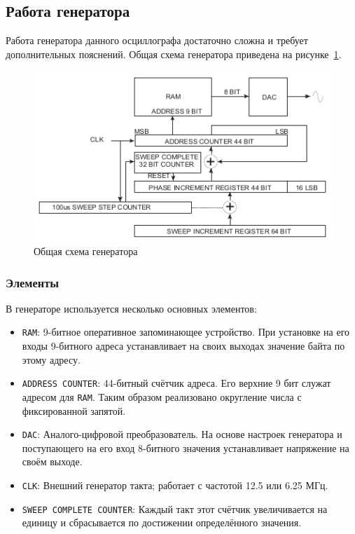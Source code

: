 \documentclass[a4paper,12pt]{report}
\numberwithin{equation}{section}
\begin{document}
\subsection{Работа генератора}
Работа генератора данного осциллографа достаточно сложна и требует
дополнительных пояснений. Общая схема генератора приведена на
рисунке~\ref{gen:plot}.

\begin{figure}[h!]
\centering
\includegraphics{sweep}
\caption{Общая схема генератора}
\label{gen:plot}
\end{figure}

\subsubsection{Элементы}
В генераторе используется несколько основных элементов:
\begin{itemize}
\item \texttt{RAM}: 9-битное оперативное запоминающее устройство. При установке на его
  входы 9-битного адреса устанавливает на своих выходах значение байта по этому
  адресу.
\item \texttt{ADDRESS COUNTER}: 44-битный счётчик адреса. Его верхние 9 бит
  служат адресом для \texttt{RAM}. Таким образом реализовано округление числа с
  фиксированной запятой.
\item \texttt{DAC}: Аналого-цифровой преобразователь. На основе настроек
  генератора и поступающего на его вход 8-битного значения устанавливает
  напряжение на своём выходе.
\item \texttt{CLK}: Внешний генератор такта; работает с частотой 12.5 или 6.25
  МГц.
\item \texttt{SWEEP COMPLETE COUNTER}: Каждый такт этот счётчик увеличивается на
  единицу и сбрасывается по достижении определённого значения.
\end{itemize}
\end{document}
